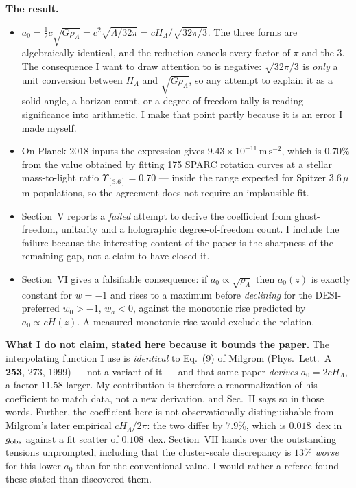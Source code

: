 \documentclass[11pt]{article}
\begin{document}
\vspace{0.6em}
\noindent\textbf{The result.}
\begin{itemize}
\item $a_0 = \tfrac12 c\sqrt{G\rho_\Lambda} = c^2\sqrt{\Lambda/32\pi} = cH_\Lambda/\sqrt{32\pi/3}$. The
three forms are algebraically identical, and the reduction cancels every factor of $\pi$ and the 3. The
consequence I want to draw attention to is negative: $\sqrt{32\pi/3}$ is \emph{only} a unit conversion
between $H_\Lambda$ and $\sqrt{G\rho_\Lambda}$, so any attempt to explain it as a solid angle, a horizon
count, or a degree-of-freedom tally is reading significance into arithmetic. I make that point partly
because it is an error I made myself.
\item On Planck 2018 inputs the expression gives $9.43\times10^{-11}\,\mathrm{m\,s^{-2}}$, which is
$0.70\%$ from the value obtained by fitting 175 SPARC rotation curves at a stellar mass-to-light ratio
$\Upsilon_{[3.6]} = 0.70$ --- inside the range expected for Spitzer $3.6\,\mu$m populations, so the
agreement does not require an implausible fit.
\item Section~V reports a \emph{failed} attempt to derive the coefficient from ghost-freedom, unitarity
and a holographic degree-of-freedom count. I include the failure because the interesting content of the
paper is the sharpness of the remaining gap, not a claim to have closed it.
\item Section~VI gives a falsifiable consequence: if $a_0\propto\sqrt{\rho_\Lambda}$ then $a_0(z)$ is
exactly constant for $w=-1$ and rises to a maximum before \emph{declining} for the DESI-preferred
$w_0>-1$, $w_a<0$, against the monotonic rise predicted by $a_0\propto cH(z)$. A measured monotonic rise
would exclude the relation.
\end{itemize}

\vspace{0.4em}
\noindent\textbf{What I do not claim, stated here because it bounds the paper.}
The interpolating function I use is \emph{identical} to Eq.~(9) of Milgrom (Phys.\ Lett.\ A \textbf{253},
273, 1999) --- not a variant of it --- and that same paper \emph{derives} $a_0 = 2cH_\Lambda$, a factor
$11.58$ larger. My contribution is therefore a renormalization of his coefficient to match data, not a new
derivation, and Sec.~II says so in those words. Further, the coefficient here is not observationally
distinguishable from Milgrom's later empirical $cH_\Lambda/2\pi$: the two differ by $7.9\%$, which is
$0.018$~dex in $g_{\rm obs}$ against a fit scatter of $0.108$~dex. Section~VII hands over the outstanding
tensions unprompted, including that the cluster-scale discrepancy is $13\%$ \emph{worse} for this lower
$a_0$ than for the conventional value. I would rather a referee found these stated than discovered them.
\end{document}
